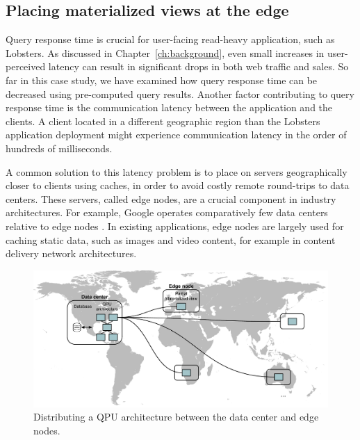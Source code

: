 \subsection{Placing materialized views at the edge}


Query response time is crucial for user-facing read-heavy application, such as Lobsters.
As discussed in Chapter~\ref{ch:background}, even small increases in user-perceived latency can result in significant drops in both web traffic and sales.
So far in this case study, we have examined how query response time can be decreased using pre-computed query results.
Another factor contributing to query response time is the communication latency between the application and the clients.
A client located in a different geographic region than the Lobsters application deployment might experience communication
latency in the order of hundreds of milliseconds.

A common solution to this latency problem is to place on servers geographically closer to clients using caches,
in order to avoid costly remote round-trips to data centers.
These servers, called edge nodes, are a crucial component in industry architectures.
For example, Google operates comparatively few data centers relative to edge nodes \cite{google:infra}.
In existing applications,
edge nodes are largely used for caching static data, such as images and video content, for example in content delivery network architectures.

\begin{figure}[t]
  \centering
    \includegraphics[scale=0.4]{./figures/case_studies/lobsters_architecture_edge.pdf}
  \caption{Distributing a QPU architecture between the data center and edge nodes.}
  \label{fig:lobsters_architecture_edge}
\end{figure}

